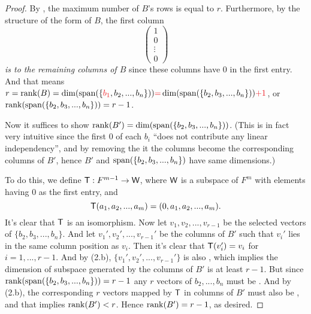 \begin{proof}
By , the maximum number of \(B\)'s \LID{} rows is equal to \(r\).
Furthermore, by the structure of the form of \(B\), the first column
\[
    \begin{pmatrix} 1 \\ 0 \\ \vdots \\ 0 \end{pmatrix}
\]
\emph{is \LID{} to the remaining columns of \(B\)} since these columns have \(0\) in the first entry.
And that means \(r = \rank(B) = \dim(\spann(\{ \RED{b_1}, b_2, ..., b_n \})) \RED{=} \dim(\spann(\{ b_2, b_3, ..., b_n \})) \RED{+ 1}\), or \(\mathrm{rank}(\operatorname{span}(\{ b_2, b_3, ..., b_n \})) = r - 1\).

Now it suffices to show \(\mathrm{rank}(B') = \dim(\operatorname{span}(\{ b_2, b_3, ..., b_n \}))\).
(This is in fact very intuitive since the first \(0\) of each \(b_i\) ``does not contribute any linear independency'', and by removing the it the columns become the corresponding columns of \(B'\), hence \(B'\) and \(\operatorname{span}(\{ b_2, b_3, ..., b_n \})\) have same dimensions.)

To do this, we define \(\textsf{T} : F^{m - 1} \to \textsf{W}\), where \(\textsf{W}\) is a subspace of \(F^m\) with elements having \(0\) as the first entry,
and
\[
    \textsf{T}(a_1, a_2, ..., a_m) = (0, a_1, a_2, ..., a_m).
\]
It's clear that \(\textsf{T}\) is an isomorphism.
Now let \(v_1, v_2, ..., v_{r - 1}\) be the selected \LID{} vectors of \(\{ b_2, b_3, ..., b_n \}\).
And let \(v_1', v_2', ..., v_{r - 1}'\) be the columns of \(B'\) such that \(v_i'\) lies in the same column position as \(v_i\).
Then it's clear that \(\textsf{T}(v_i') = v_i\) for \(i = 1, ..., r - 1\).
And by (2.b), \(\{ v_1', v_2', ..., v_{r - 1}'\}\) is also \LID{}, which implies the dimension of subspace generated by the columns of \(B'\) is at least \(r - 1\).
But since \(\mathrm{rank}(\operatorname{span}(\{ b_2, b_3, ..., b_n \})) = r - 1\) any \(r\) vectors  of \(b_2, ..., b_n\) must be \LDP{}.
And by (2.b), the corresponding \(r\) vectors mapped by \(\textsf{T}\) in columns of \(B'\) must also be \LDP{}, and that implies \(\mathrm{rank}(B') < r\).
Hence \(\mathrm{rank}(B') = r - 1\), as desired.
\end{proof}

